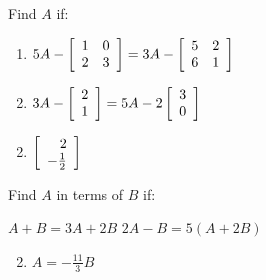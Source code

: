 \begin{multicols}{2}
\begin{ex}
\begin{sol}
\begin{enumerate}[label={\alph*.}]
\end{enumerate}
\end{sol}
\end{ex}

\begin{ex}
Find $A$ if:


\begin{enumerate}[label={\alph*.}]
\item 
$
5A - \left[ \begin{array}{rr}
1 & 0 \\
2 & 3
\end{array} \right] =
3A - \left[ \begin{array}{rr}
5 & 2 \\
6 & 1
\end{array} \right]
$

\item $
3A - \left[ \begin{array}{r}
2 \\
1
\end{array} \right] =
5A - 2 \left[ \begin{array}{rr}
3 \\
0
\end{array} \right]
$

\end{enumerate}
\begin{sol}
\begin{enumerate}[label={\alph*.}]
\setcounter{enumi}{1}
\item  
$\left[ \begin{array}{r}
2 \\
-\tfrac{1}{2}
\end{array} \right]$

\end{enumerate}
\end{sol}
\end{ex}

\begin{ex}
Find $A$ in terms of $B$ if:


\begin{exenumerate}
\exitem $A + B = 3A + 2B$
\exitem $2A - B = 5(A + 2B)$
\end{exenumerate}
\begin{sol}
\begin{enumerate}[label={\alph*.}]
\setcounter{enumi}{1}
\item  
$A = -\frac{11}{3}B$

\end{enumerate}
\end{sol}
\end{ex}


\end{multicols}
